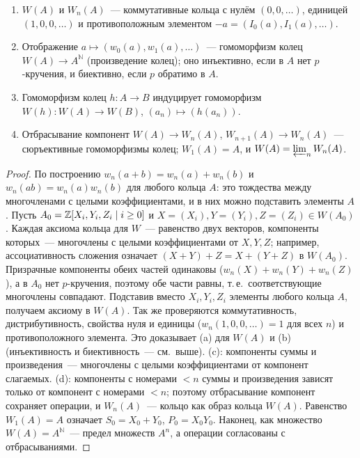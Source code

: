 \begin{proposition}[5.32n]
\begin{enumerate}[label=\textup{(\alph*)}]
\item $W(A)$ и $W_n(A)$~--- коммутативные кольца с нулём $(0,0,\dots)$, единицей $(1,0,0,\dots)$ и противоположным
элементом $-a=(I_0(a),I_1(a),\dots)$.
\item Отображение $a\mapsto(w_0(a),w_1(a),\dots)$~--- гомоморфизм колец $W(A)\to A^{\mathbb N}$ (произведение колец); оно
инъективно, если в $A$ нет $p$-кручения, и биективно, если $p$ обратимо в $A$.
\item Гомоморфизм колец $h\colon A\to B$ индуцирует гомоморфизм $W(h)\colon W(A)\to W(B)$, $(a_n)\mapsto(h(a_n))$.
\item Отбрасывание компонент $W(A)\to W_n(A)$, $W_{n+1}(A)\to W_n(A)$~--- сюръективные гомоморфизмы колец; $W_1(A)=A$,
и $W(A)=\varprojlim_nW_n(A)$.
\end{enumerate}
\end{proposition}

\begin{proof}
По построению $w_n(a+b)=w_n(a)+w_n(b)$ и $w_n(ab)=w_n(a)w_n(b)$ для любого кольца $A$: это тождества между многочленами с
целыми коэффициентами, и в них можно подставить элементы $A$. Пусть $A_0=\mathbb Z[X_i,Y_i,Z_i\mid i\ge0]$ и
$X=(X_i),Y=(Y_i),Z=(Z_i)\in W(A_0)$. Каждая аксиома кольца для $W$~--- равенство двух векторов, компоненты которых~---
многочлены с целыми коэффициентами от $X,Y,Z$; например, ассоциативность сложения означает $(X+Y)+Z=X+(Y+Z)$ в $W(A_0)$.
Призрачные компоненты обеих частей одинаковы ($w_n(X)+w_n(Y)+w_n(Z)$), а в $A_0$ нет $p$-кручения, поэтому обе части
равны, т.\,е.\ соответствующие многочлены совпадают. Подставив вместо $X_i,Y_i,Z_i$ элементы любого кольца $A$, получаем
аксиому в $W(A)$. Так же проверяются коммутативность, дистрибутивность, свойства нуля и единицы
($w_n(1,0,0,\dots)=1$ для всех $n$) и противоположного элемента. Это доказывает (a) для $W(A)$ и (b) (инъективность и
биективность~--- см.\ выше). (c): компоненты суммы и произведения~--- многочлены с целыми коэффициентами от компонент
слагаемых. (d): компоненты с номерами $<n$ суммы и произведения зависят только от компонент с номерами $<n$; поэтому
отбрасывание компонент сохраняет операции, и $W_n(A)$~--- кольцо как образ кольца $W(A)$. Равенство $W_1(A)=A$
означает $S_0=X_0+Y_0$, $P_0=X_0Y_0$. Наконец, как множество $W(A)=A^{\mathbb N}$~--- предел множеств $A^n$, а операции
согласованы с отбрасываниями.
\end{proof}

